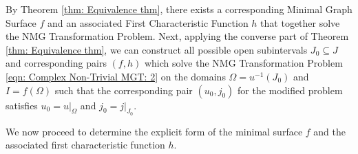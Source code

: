 \documentclass[12pt]{article}
\theoremstyle{plain}
\theoremstyle{definition}
\theoremstyle{remark}
\begin{document}
 By Theorem \ref{thm: Equivalence thm}, there exists a corresponding Minimal Graph Surface $f$ and an associated First Characteristic Function $h$ that together solve the NMG Transformation Problem. Next, applying the converse part of Theorem \ref{thm: Equivalence thm}, we can construct all possible open subintervals $J_0 \subseteq J$ and corresponding pairs $(f, h)$ which solve the NMG Transformation Problem \ref{eqn: Complex Non-Trivial MGT: 2} on the domains $\Omega = u^{-1}(J_0)$ and $I = f(\Omega)$ such that the corresponding pair $(u_0, j_0)$ for the modified problem satisfies $u_0 = u|_{\Omega}$ and $j_0 = j|_{J_0}$.

 We now proceed to determine the explicit form of the minimal surface $f$ and the associated first characteristic function $h$.\\
  
\end{document}
